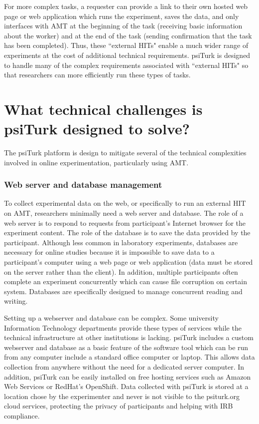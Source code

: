 \documentclass[twocolumn]{svjour3}          %
\begin{document}
For more complex tasks, a requester can provide a link to their own hosted web page or
web application which runs the 
experiment, saves the data, and only interfaces with AMT at the beginning of the task (receiving 
basic information about the worker) and at the end of the task (sending confirmation that the task 
has been completed).  Thus, these ``external HITs" enable a much wider range of experiments at 
the cost of additional technical requirements.  \textsf{psiTurk} is designed to handle many of the 
complex requirements associated with ``external HITs" so that researchers can more efficiently run 
these types of tasks.



\section{What technical challenges is \textsf{psiTurk} designed to solve?}

The \textsf{psiTurk} platform is design to mitigate several of the technical complexities
involved in online experimentation, particularly using AMT.

\subsubsection{Web server and database management} 
To collect experimental data on the web, or specifically to run an external HIT on AMT, 
researchers minimally need a web server and database.  
The role of a web server is to respond to requests from participant's Internet browser 
for the experiment content.  The role of the database is to save the data provided by 
the participant.  Although less common in laboratory experiments, databases are 
necessary for online studies because it is impossible to save data to a participant's 
computer using a web page or web application (data must be stored on the server
rather than the client).  In addition, multiple participants often complete an 
experiment concurrently which can cause file corruption on certain system.  
Databases are specifically designed to manage concurrent reading and writing.
 
Setting up a webserver and database can be complex.  Some university Information
Technology departments
provide these types of services while the technical infrastructure at other 
institutions is lacking.  \textsf{psiTurk} includes a custom webserver and database
as a basic feature of the software tool which can be run from any computer
include a standard office computer or laptop.  This allows data collection from
anywhere without the need for a dedicated server computer.  In addition, \textsf{psiTurk}
can be easily installed on free hosting services such as Amazon Web Services
or RedHat's OpenShift.  Data collected with \textsf{psiTurk} is stored at a location
chose by the experimenter and never is not visible to the psiturk.org cloud
services, protecting the privacy of participants and helping with IRB compliance.
\end{document}

